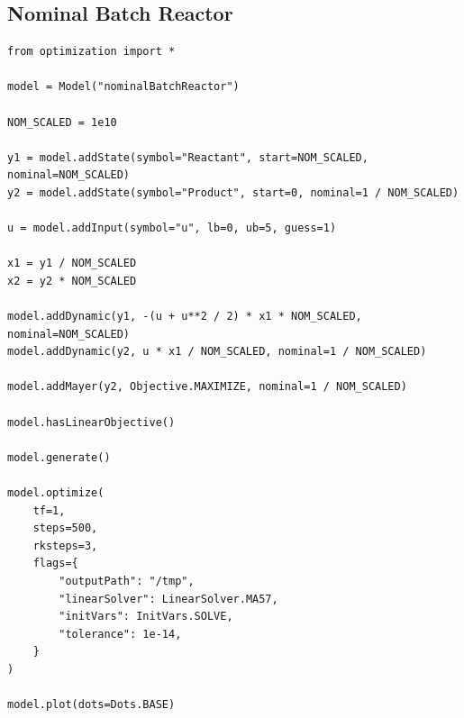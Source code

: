 \documentclass[12pt]{article}
\begin{document}
\subsection{Nominal Batch Reactor}

\begin{lstlisting}	
from optimization import *

model = Model("nominalBatchReactor")

NOM_SCALED = 1e10

y1 = model.addState(symbol="Reactant", start=NOM_SCALED, nominal=NOM_SCALED)
y2 = model.addState(symbol="Product", start=0, nominal=1 / NOM_SCALED)

u = model.addInput(symbol="u", lb=0, ub=5, guess=1)

x1 = y1 / NOM_SCALED
x2 = y2 * NOM_SCALED

model.addDynamic(y1, -(u + u**2 / 2) * x1 * NOM_SCALED, nominal=NOM_SCALED)
model.addDynamic(y2, u * x1 / NOM_SCALED, nominal=1 / NOM_SCALED)

model.addMayer(y2, Objective.MAXIMIZE, nominal=1 / NOM_SCALED)

model.hasLinearObjective()

model.generate()

model.optimize(
	tf=1,
	steps=500,
	rksteps=3,
	flags={
		"outputPath": "/tmp",
		"linearSolver": LinearSolver.MA57,
		"initVars": InitVars.SOLVE,
		"tolerance": 1e-14,
	}
)

model.plot(dots=Dots.BASE)

\end{lstlisting}
\end{document}
